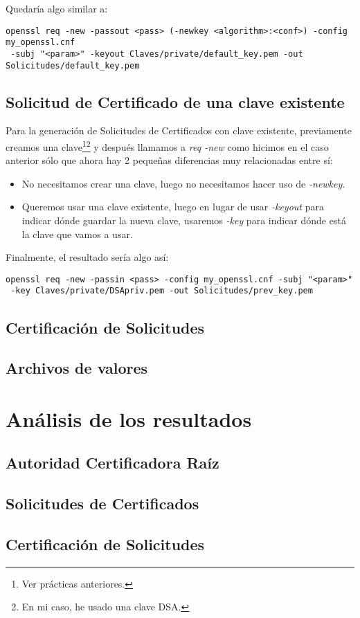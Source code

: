 \documentclass[a4paper, 11pt]{article}
\begin{document}
		Quedaría algo similar a:\\
		\begin{small}
			\verb|openssl req -new -passout <pass> (-newkey <algorithm>:<conf>) -config my_openssl.cnf|\\
			\verb| -subj "<param>" -keyout Claves/private/default_key.pem -out Solicitudes/default_key.pem|\\
		\end{small}
	
	\subsection{Solicitud de Certificado de una clave existente}
		Para la generación de Solicitudes de Certificados con clave existente, previamente creamos una clave\footnote{Ver
		prácticas anteriores.}\footnote{En mi caso, he usado una clave DSA.} y después llamamos a \textit{req -new} como
		hicimos en el caso anterior sólo que ahora hay 2 pequeñas diferencias muy relacionadas entre sí:
		\begin{itemize}
			\item No necesitamos crear una clave, luego no necesitamos hacer uso de \textit{-newkey}.
			
			\item Queremos usar una clave existente, luego en lugar de usar \textit{-keyout} para indicar dónde guardar la
			nueva clave, usaremos \textit{-key} para indicar dónde está la clave que vamos a usar.
		\end{itemize}
		
		Finalmente, el resultado sería algo así:\\
		\begin{small}
			\verb|openssl req -new -passin <pass> -config my_openssl.cnf -subj "<param>"|\\
			\verb| -key Claves/private/DSApriv.pem -out Solicitudes/prev_key.pem|\\
		\end{small}
	
	\subsection{Certificación de Solicitudes}
	\subsection{Archivos de valores}
			
\section{Análisis de los resultados}
	\subsection{Autoridad Certificadora Raíz}
	\subsection{Solicitudes de Certificados}
	\subsection{Certificación de Solicitudes}
	
\end{document}
